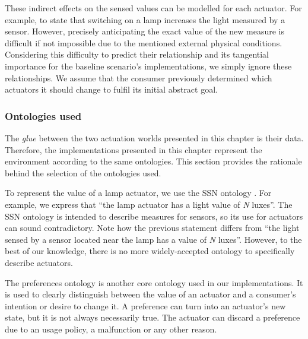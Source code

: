 These indirect effects on the sensed values can be modelled for each actuator.
For example, to state that switching on a lamp increases the light measured by a sensor.
However, precisely anticipating the exact value of the new measure is difficult if not impossible due to the mentioned external physical conditions.
Considering this difficulty to predict their relationship and its tangential importance for the baseline scenario's implementations, we simply ignore these relationships.
We assume that the consumer previously determined which actuators it should change to fulfil its initial abstract goal.


\subsubsection{Ontologies used}

The \emph{glue} between the two actuation worlds presented in this chapter is their data.
Therefore, the implementations presented in this chapter represent the environment according to the same ontologies. %
This section provides the rationale behind the selection of the ontologies used.


To represent the value of a lamp actuator, we use the SSN ontology .
For example, we express that ``the lamp actuator has a light value of \emph{N} luxes''.
The SSN ontology is intended to describe measures for sensors, so its use for actuators can sound contradictory.
Note how the previous statement differs from ``the light sensed by a sensor located near the lamp has a value of \emph{N} luxes''.
However, to the best of our knowledge, there is no more widely-accepted ontology to specifically describe actuators.


The preferences ontology is another core ontology used in our implementations.
It is used to clearly distinguish between the value of an actuator and a consumer's intention or desire to change it.
A preference can turn into an actuator's new state, but it is not always necessarily true.
The actuator can discard a preference due to an usage policy, a malfunction or any other reason.

